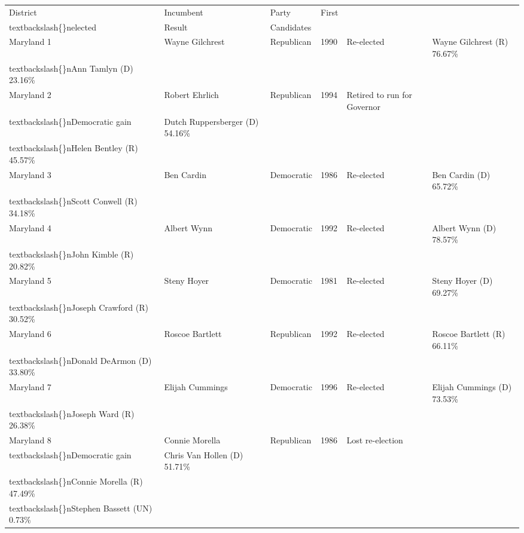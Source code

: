 \documentclass{article}
\begin{document}
\begin{tabular}{llllll}
\toprule
District & Incumbent & Party & First\\textbackslash\{\}nelected & Result & Candidates \\
\midrule
Maryland 1 & Wayne Gilchrest & Republican & 1990 & Re-elected & Wayne Gilchrest (R) 76.67\%\\textbackslash\{\}nAnn Tamlyn (D) 23.16\% \\
Maryland 2 & Robert Ehrlich & Republican & 1994 & Retired to run for Governor\\textbackslash\{\}nDemocratic gain & Dutch Ruppersberger (D) 54.16\%\\textbackslash\{\}nHelen Bentley (R) 45.57\% \\
Maryland 3 & Ben Cardin & Democratic & 1986 & Re-elected & Ben Cardin (D) 65.72\%\\textbackslash\{\}nScott Conwell (R) 34.18\% \\
Maryland 4 & Albert Wynn & Democratic & 1992 & Re-elected & Albert Wynn (D) 78.57\%\\textbackslash\{\}nJohn Kimble (R) 20.82\% \\
Maryland 5 & Steny Hoyer & Democratic & 1981 & Re-elected & Steny Hoyer (D) 69.27\%\\textbackslash\{\}nJoseph Crawford (R) 30.52\% \\
Maryland 6 & Roscoe Bartlett & Republican & 1992 & Re-elected & Roscoe Bartlett (R) 66.11\%\\textbackslash\{\}nDonald DeArmon (D) 33.80\% \\
Maryland 7 & Elijah Cummings & Democratic & 1996 & Re-elected & Elijah Cummings (D) 73.53\%\\textbackslash\{\}nJoseph Ward (R) 26.38\% \\
Maryland 8 & Connie Morella & Republican & 1986 & Lost re-election\\textbackslash\{\}nDemocratic gain & Chris Van Hollen (D) 51.71\%\\textbackslash\{\}nConnie Morella (R) 47.49\%\\textbackslash\{\}nStephen Bassett (UN) 0.73\% \\
\bottomrule
\end{tabular}
\end{document}
